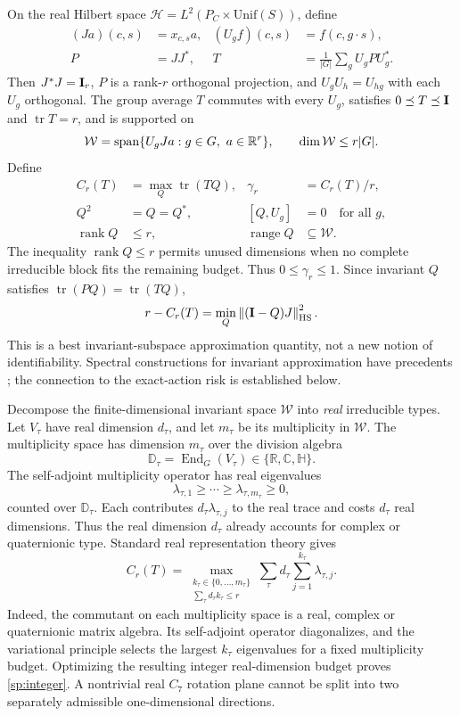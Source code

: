 On the real Hilbert space $\mathcal H=L^2(P_C\times\mathrm{Unif}(S))$, define
\[
 \begin{aligned}
 (Ja)(c,s)&=x_{c,s}a,
 &
 (U_gf)(c,s)&=f(c,g\cdot s),
 \\
 P&=JJ^*,
 &
 T&=\frac1{|G|}\sum_gU_gPU_g^*.
 \end{aligned}
\]
Then $J^*J=\mathbf{I}_r$, $P$ is a rank-$r$ orthogonal projection, and $U_gU_h=U_{hg}$ with each $U_g$ orthogonal. The group average $T$ commutes with every $U_g$, satisfies $0\preceq T\preceq\mathbf{I}$ and $\operatorname{tr}T=r$, and is supported on
\[
 \mathcal W=\operatorname{span}\{U_gJa:g\in G,\ a\in\mathbb{R}^r\},\qquad \dim\mathcal W\le r|G|.
\]
Define
\begin{equation}
 \begin{aligned}
 C_r(T)&=\max_Q\operatorname{tr}(TQ),
 &
 \gamma_r&=C_r(T)/r,
 \\
 Q^2&=Q=Q^*,
 &
 [Q,U_g]&=0\quad\text{for all }g,
 \\
 \operatorname{rank}Q&\le r,
 &
 \operatorname{range}Q&\subseteq\mathcal W.
 \end{aligned}
 \label{sp:budget}
\end{equation}
The inequality $\operatorname{rank}Q\le r$ permits unused dimensions when no complete irreducible block fits the remaining budget. Thus $0\le\gamma_r\le1$. Since invariant $Q$ satisfies $\operatorname{tr}(PQ)=\operatorname{tr}(TQ)$,
\[
 r-C_r(T)=\min_Q\left\lVert (\mathbf{I}-Q)J\right\rVert_{\mathrm{HS}}^2.
\]
This is a best invariant-subspace approximation quantity, not a new notion of identifiability. Spectral constructions for invariant approximation have precedents \citep{barbieri2020approximation}; the connection to the exact-action risk is established below.

Decompose the finite-dimensional invariant space $\mathcal W$ into \emph{real} irreducible types. Let $V_\tau$ have real dimension $d_\tau$, and let $m_\tau$ be its multiplicity in $\mathcal W$. The multiplicity space has dimension $m_\tau$ over the division algebra
\[
 \mathbb D_\tau
 =
 \operatorname{End}_G(V_\tau)
 \in\{\mathbb R,\mathbb C,\mathbb H\}.
\]
The self-adjoint multiplicity operator has real eigenvalues
\[
 \lambda_{\tau,1}
 \ge\cdots\ge
 \lambda_{\tau,m_\tau}
 \ge0,
\]
counted over $\mathbb D_\tau$. Each contributes $d_\tau\lambda_{\tau,j}$ to the real trace and costs $d_\tau$ real dimensions. Thus the real dimension $d_\tau$ already accounts for complex or quaternionic type. Standard real representation theory \citep{serre1977linear} gives
\begin{equation}
 C_r(T)=\max_{\substack{k_\tau\in\{0,\ldots,m_\tau\}\\\sum_\tau d_\tau k_\tau\le r}}
 \sum_\tau d_\tau\sum_{j=1}^{k_\tau}\lambda_{\tau,j}.
 \label{sp:integer}
\end{equation}
Indeed, the commutant on each multiplicity space is a real, complex or quaternionic matrix algebra. Its self-adjoint operator diagonalizes, and the variational principle selects the largest $k_\tau$ eigenvalues for a fixed multiplicity budget. Optimizing the resulting integer real-dimension budget proves \cref{sp:integer}. A nontrivial real $C_7$ rotation plane cannot be split into two separately admissible one-dimensional directions.


